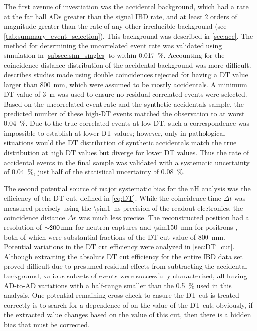 The first avenue of investiation was the accidental background,
which had a rate at the far hall ADs greater than the signal IBD rate,
and at least 2 orders of magnitude greater than the rate
of any other irreducible background (see \cref{tab:summary_event_selection}).
This background was described in \cref{sec:acc}.
The method for determining the uncorrelated event rate
was validated using simulation in \cref{subsec:sim_singles}
to within \SI{0.017}{\percent}.
Accounting for the coincidence distance distribution of the accidental background
was more difficult.
 describes studies made using double coincidences
rejected for having a DT value larger than \SI{800}{\mm},
which were assumed to be mostly accidentals.
A minimum DT value of \SI{3}{\m} was used to ensure no residual correlated events
were selected.
Based on the uncorrelated event rate and the synthetic accidentals sample,
the predicted number of these high-DT events matched the observation
to at worst \SI{0.04}{\percent}.
Due to the true correlated events at low DT, such a correspondence
was impossible to establish at lower DT values;
however, only in pathological situations
would the DT distribution of synthetic accidentals match the true distribution
at high DT values but diverge for lower DT values.
Thus the rate of accidental events in the final sample
was validated with a systematic uncertainty of \SI{0.04}{\percent},
just half of the statistical uncertainty of \SI{0.08}{\percent}.

The second potential source of major systematic bias for the nH analysis
was the efficiency of the DT cut, defined in \cref{eq:DT}.
While the coincidence time $\Delta t$ was measured precisely
using the \SI{\sim1}{\ns} precision of the readout electronics,
the coincidence distance $\Delta r$ was much less precise.
The reconstructed position had a resolution
of $\SI{\sim200}{\mm}$ for neutron captures
and \SI{\sim150}{\mm} for positrons \cite{adsimple1},
both of which were substantial fractions of the DT cut value of \SI{800}{\mm}.
Potential variations in the DT cut efficiency
were analyzed in \cref{sec:DT_cut}.
Although extracting the absolute DT cut efficiency
for the entire IBD data set proved difficult
due to presumed residual effects from subtracting the accidental background,
various subsets of events were successfully characterized,
all having AD-to-AD variations with a half-range smaller than
the \SI{0.5}{\percent} used in this analysis.
One potential remaining cross-check to ensure the DT cut is treated correctly
is to search for a dependence of \thetaot{} on the value of the DT cut;
obviously, if the extracted value \thetaot{} changes
based on the value of this cut,
then there is a hidden bias that must be corrected.

